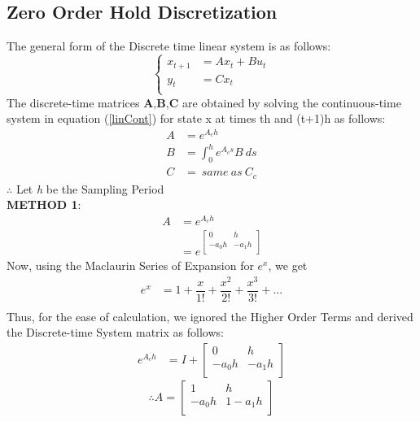 \documentclass[a4paper,12pt]{article}
\begin{document}
	\subsection{Zero Order Hold Discretization}
	The general form of the Discrete time linear system is as follows:
	\begin{equation}
\begin{cases}
		x_{t+1} &= A x_t + B u_t \\
		y_t &= C x_t \\
	\end{cases}
	\label{linDisc}
\end{equation}
The discrete-time matrices \textbf{A},\textbf{B},\textbf{C} are obtained by solving the continuous-time system in equation (\ref{linCont}) for state x at times th and (t+1)h as follows:
\begin{align*}
A &= e^{A_c h} \\
B &= \int_{0}^{h} e^{A_c s} B \ ds \\
C &= \ same \ as \ C_c
\end{align*}
$\therefore$ Let \textit{h} be the Sampling Period \\
\textbf{METHOD 1}:
\begin{align*}
A &= e^{A_c h} \\
&= e^{\begin{bmatrix}
	0 & h\\
	-a_0 h & - a_1 h\\
\end{bmatrix}}
\end{align*}
Now, using the Maclaurin Series of Expansion for $e^{x}$, we get
\begin{align*}
	e^{x} &= 1 + \dfrac{x}{1!} + \dfrac{x^2}{2!} + \dfrac{x^3}{3!} +... \\ 
\end{align*}
Thus, for the ease of calculation, we ignored the Higher Order Terms and derived the Discrete-time System matrix as follows:
\begin{align*}
	e^{A_c h} &= I + \begin{bmatrix}
		0 & h\\
		-a_0 h & - a_1 h\\
	\end{bmatrix} 
\end{align*}
\begin{equation}
\therefore
\boxed{
	A = \begin{bmatrix}
		1 & h\\
		-a_0 h & 1 - a_1 h\\
\end{bmatrix}}
\end{equation}
\end{document}
